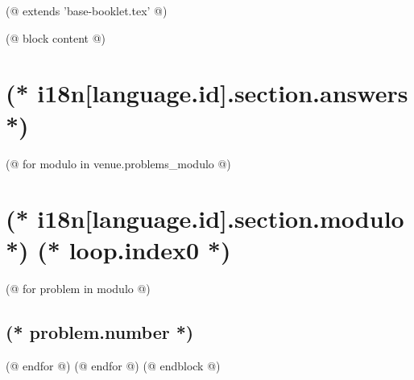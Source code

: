 (@ extends 'base-booklet.tex' @)

(@ block content @)
    \thispagestyle{first}
    \afterpage{\globaldefs=1\restoregeometry}

    \vspace*{19mm}

    \section{(* i18n[language.id].section.answers *)}
    \pagestyle{answers}
    (@ for modulo in venue.problems_modulo @)
        \newpage%
        \section{(* i18n[language.id].section.modulo *) (* loop.index0 *)}
        (@ for problem in modulo @)%
            \setcounter{volume}{(* volume.number *)}%
            \setcounter{problem}{(* problem.number *)}%
            \subsection{(* problem.number *)}%
        (@ endfor @)
    (@ endfor @)
(@ endblock @)
